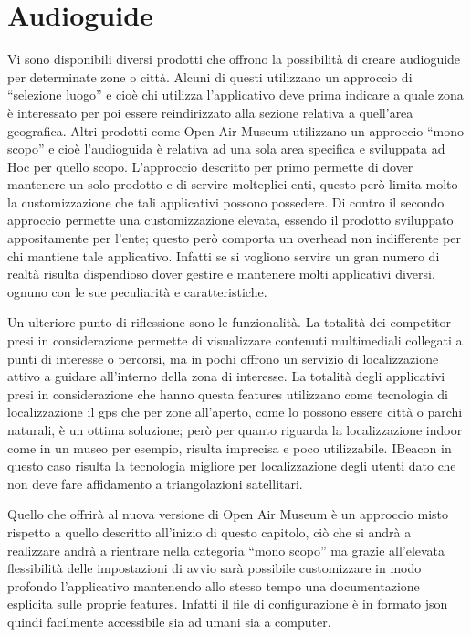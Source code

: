 \section{Audioguide}\vspace{5mm}
Vi sono disponibili diversi prodotti che offrono la possibilità di creare audioguide per determinate zone o città. Alcuni di questi utilizzano un approccio di “selezione luogo” e cioè chi utilizza l’applicativo deve prima indicare a quale zona è interessato per poi essere reindirizzato alla sezione relativa a quell’area geografica. Altri prodotti come Open Air Museum utilizzano un approccio “mono scopo” e cioè l’audioguida è relativa ad una sola area specifica e sviluppata ad Hoc per quello scopo. L’approccio descritto per primo permette di dover mantenere un solo prodotto e di servire molteplici enti, questo però limita molto la customizzazione che tali applicativi possono possedere. Di contro il secondo approccio permette una customizzazione elevata, essendo il prodotto sviluppato appositamente per l’ente; questo però comporta un overhead non indifferente per chi mantiene tale applicativo. Infatti se si vogliono servire un gran numero di realtà risulta dispendioso dover gestire e mantenere molti applicativi diversi, ognuno con le sue peculiarità e caratteristiche.\vspace{5mm}

Un ulteriore punto di riflessione sono le funzionalità. La totalità dei competitor presi in considerazione permette di visualizzare contenuti multimediali collegati a punti di interesse o percorsi, ma in pochi offrono un servizio di localizzazione attivo a guidare all’interno della zona di interesse. La totalità degli applicativi presi in considerazione che hanno questa features utilizzano come tecnologia di localizzazione il gps che per zone all’aperto, come lo possono essere città o parchi naturali, è un ottima soluzione; però per quanto riguarda la localizzazione indoor come in un museo per esempio, risulta imprecisa e poco utilizzabile. IBeacon in questo caso risulta la tecnologia migliore per localizzazione degli utenti dato che non deve fare affidamento a triangolazioni satellitari.\vspace{5mm}

Quello che offrirà al nuova versione di Open Air Museum è un approccio misto rispetto a quello descritto all’inizio di questo capitolo, ciò che si andrà a realizzare andrà a rientrare nella categoria “mono scopo” ma grazie all’elevata flessibilità delle impostazioni di avvio sarà possibile customizzare in modo profondo l’applicativo mantenendo allo stesso tempo una documentazione esplicita sulle proprie features. Infatti il file di configurazione è in formato json quindi facilmente accessibile sia ad umani sia a computer.\vspace{5mm}





